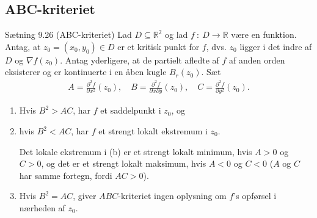\subsection{ABC-kriteriet}
\begin{boks}{Sætning 9.26 (ABC-kriteriet)}
  Lad $D \subseteq \mathbb{R}^2$ og lad $f \ : \ D \rightarrow \mathbb{R}$ være en funktion. Antag, at $z_0 = (x_0, y_0) \in D$ er et kritisk punkt for $f$, dvs. $z_0$ ligger i det indre af $D$ og $\nabla f(z_0)$. Antag yderligere, at de partielt afledte af $f$ af anden orden eksisterer og er kontinuerte i en åben kugle $B_r (z_0)$. Sæt
  \begin{align*}
    A = \frac{\partial^2 f}{\partial x^2}(z_0), \quad B = \frac{\partial^2 f}{\partial x \partial y}(z_0), \quad C = \frac{\partial^2 f}{\partial y^2}(z_0).
  \end{align*}
  \begin{enumerate}
    \item Hvis $B^2 > AC$, har $f$ et saddelpunkt i $z_0$, og
    \item hvis $B^2 < AC$, har $f$ et strengt lokalt ekstremum i $z_0$.

    Det lokale ekstremum i (b) er et strengt lokalt minimum, hvis $A > 0$ og $C > 0$, og det er et strengt lokalt maksimum, hvis $A < 0$ og $C < 0$ ($A$ og $C$ har samme fortegn, fordi $AC > 0$).
    \item Hvis $B^2 = AC$, giver $ABC$-kriteriet ingen oplysning om $f$'s opførsel i nærheden af $z_0$.
  \end{enumerate}
\end{boks}
